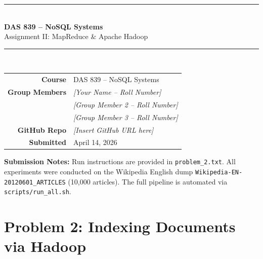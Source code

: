 \documentclass[12pt,a4paper]{article}
\begin{document}
\begin{titlepage}
    \centering
    \vspace*{1cm}
    {\color{darkblue}\rule{\linewidth}{1.5pt}}\\[0.4cm]
    {\LARGE\bfseries\color{darkblue} DAS 839 -- NoSQL Systems}\\[0.3cm]
    {\large Assignment II: MapReduce \& Apache Hadoop}\\[0.2cm]
    {\color{darkblue}\rule{\linewidth}{1.5pt}}\\[2cm]

    \begin{tabular}{rl}
        \textbf{Course}         & DAS 839 -- NoSQL Systems \\[0.4cm]
        \textbf{Group Members}  & \textit{[Your Name -- Roll Number]} \\
                                & \textit{[Group Member 2 -- Roll Number]} \\
                                & \textit{[Group Member 3 -- Roll Number]} \\[0.4cm]
        \textbf{GitHub Repo}    & \textit{[Insert GitHub URL here]} \\[0.4cm]
        \textbf{Submitted}      & April 14, 2026 \\
    \end{tabular}

    \vfill

    \begin{tcolorbox}[colback=lightblue, colframe=darkblue, width=0.95\textwidth]
        \textbf{Submission Notes:} Run instructions are provided in
        \texttt{problem\_2.txt}. All experiments were conducted on the Wikipedia
        English dump \texttt{Wikipedia-EN-20120601\_ARTICLES} (10,000 articles).
        The full pipeline is automated via \texttt{scripts/run\_all.sh}.
    \end{tcolorbox}
\end{titlepage}

\tableofcontents
\newpage

\section{Problem 2: Indexing Documents via Hadoop}
\end{document}
